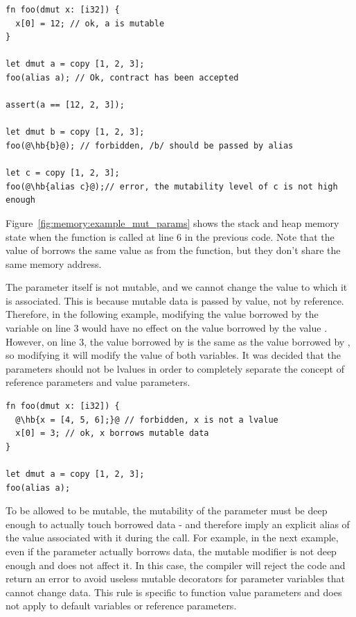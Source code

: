 \begin{lstlisting}[style=coloredverbatimError, escapechar=@]
fn foo(dmut x: [i32]) {
  x[0] = 12; // ok, a is mutable
}

let dmut a = copy [1, 2, 3];
foo(alias a); // Ok, contract has been accepted

assert(a == [12, 2, 3]);

let dmut b = copy [1, 2, 3];
foo(@\hb{b}@); // forbidden, /b/ should be passed by alias

let c = copy [1, 2, 3];
foo(@\hb{alias c}@);// error, the mutability level of c is not high enough
\end{lstlisting}

Figure~\ref{fig:memory:example_mut_params} shows the stack and heap memory state when
the  function is called at line 6 in the previous code. Note that
the value of  borrows the same value as  from the
 function, but they don't share the same memory address.



The parameter itself is not mutable, and we cannot change the value to which it
is associated. This is because mutable data is passed by value, not by
reference. Therefore, in the following example, modifying the value borrowed by
the variable  on line 3 would have no effect on the value borrowed by
the value . However, on line 3, the value borrowed by  is the
same as the value borrowed by , so modifying it will modify the value
of both variables. It was decided that the parameters should not be lvalues in
order to completely separate the concept of reference parameters and value
parameters.

\begin{lstlisting}[style=coloredverbatimError, escapechar=@]
fn foo(dmut x: [i32]) {
  @\hb{x = [4, 5, 6];}@ // forbidden, x is not a lvalue
  x[0] = 3; // ok, x borrows mutable data
}

let dmut a = copy [1, 2, 3];
foo(alias a);
\end{lstlisting}

To be allowed to be mutable, the mutability of the parameter must be deep enough
to actually touch borrowed data - and therefore imply an explicit alias of the
value associated with it during the call. For example, in the next example, even
if the parameter actually borrows data, the mutable modifier is not deep enough
and does not affect it. In this case, the compiler will reject the code and
return an error to avoid useless mutable decorators for parameter variables that
cannot change data. This rule is specific to function value parameters and does
not apply to default variables or reference parameters.

